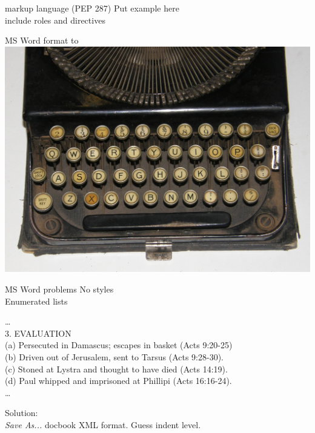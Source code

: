 \documentclass{beamer}
\begin{document}
    \begin{frame}{\rst markup language (PEP 287)}
        Put example here\\
        include roles and directives
    \end{frame}

    \begin{frame}{MS Word format to \rst}
        \includegraphics[keepaspectratio=true, width=\paperwidth]{typewriter_keyboard.jpg}
    \end{frame}
    
    \begin{frame}{MS Word problems}
    No styles\\
        Enumerated lists
        \begin{framed} %
            \ldots\\
3. EVALUATION\\
\quad (a) Persecuted in Damascus; escapes in basket (Acts 9:20-25)\\
\quad (b) Driven out of Jerusalem, sent to Tarsus (Acts 9:28-30).\\
\quad (c) Stoned at Lystra and thought to have died (Acts 14:19).\\
        \quad (d) Paul whipped and imprisoned at Phillipi (Acts 16:16-24).\\
        \ldots
    \end{framed}
    Solution:\\
    \emph{Save As...} docbook XML format. Guess indent level.  
    \end{frame}
    
\end{document}
